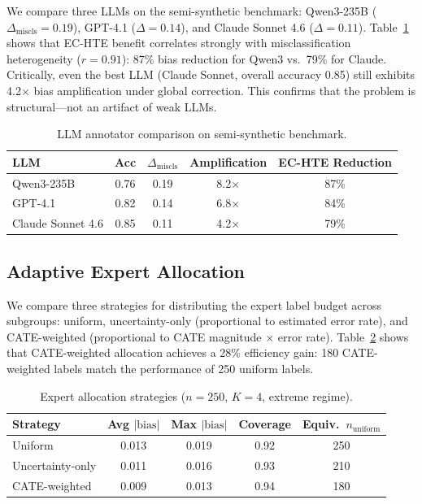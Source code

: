 \documentclass[11pt,a4paper]{article}
\begin{document}
We compare three LLMs on the semi-synthetic benchmark: Qwen3-235B ($\Delta_{\text{miscls}} = 0.19$), GPT-4.1 ($\Delta = 0.14$), and Claude Sonnet 4.6 ($\Delta = 0.11$).
Table~\ref{tab:multi_llm} shows that EC-HTE benefit correlates strongly with misclassification heterogeneity ($r = 0.91$): 87\% bias reduction for Qwen3 vs.\ 79\% for Claude.
Critically, even the best LLM (Claude Sonnet, overall accuracy 0.85) still exhibits 4.2$\times$ bias amplification under global correction.
This confirms that the problem is structural---not an artifact of weak LLMs.

\begin{table}[t]
\centering
\small
\caption{LLM annotator comparison on semi-synthetic benchmark.}
\label{tab:multi_llm}
\begin{tabular}{l cccc}
\toprule
LLM & Acc & $\Delta_{\text{miscls}}$ & Amplification & EC-HTE Reduction \\
\midrule
Qwen3-235B       & 0.76 & 0.19 & 8.2$\times$ & 87\% \\
GPT-4.1          & 0.82 & 0.14 & 6.8$\times$ & 84\% \\
Claude Sonnet 4.6 & 0.85 & 0.11 & 4.2$\times$ & 79\% \\
\bottomrule
\end{tabular}
\end{table}

\subsection{Adaptive Expert Allocation}
\label{sec:allocation}

We compare three strategies for distributing the expert label budget across subgroups: uniform, uncertainty-only (proportional to estimated error rate), and CATE-weighted (proportional to CATE magnitude $\times$ error rate).
Table~\ref{tab:allocation} shows that CATE-weighted allocation achieves a 28\% efficiency gain: 180 CATE-weighted labels match the performance of 250 uniform labels.

\begin{table}[t]
\centering
\small
\caption{Expert allocation strategies ($n = 250$, $K = 4$, extreme regime).}
\label{tab:allocation}
\begin{tabular}{l cccc}
\toprule
Strategy & Avg $|\text{bias}|$ & Max $|\text{bias}|$ & Coverage & Equiv.\ $n_{\text{uniform}}$ \\
\midrule
Uniform          & 0.013 & 0.019 & 0.92 & 250 \\
Uncertainty-only & 0.011 & 0.016 & 0.93 & 210 \\
CATE-weighted    & 0.009 & 0.013 & 0.94 & 180 \\
\bottomrule
\end{tabular}
\end{table}
\end{document}
